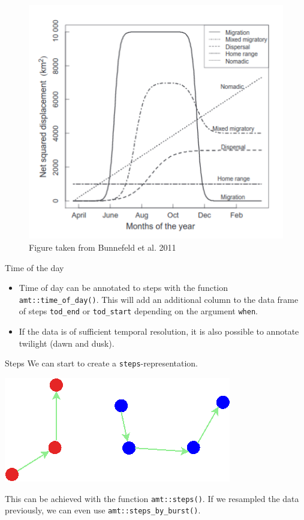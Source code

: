 \documentclass[ignorenonframetext,,t]{beamer}
\providecommand{\tightlist}{%
\setlength{\itemsep}{0pt}\setlength{\parskip}{0pt}}
\providecommand{\tightlist}{%
\setlength{\itemsep}{0pt}\setlength{\parskip}{0pt}}
\renewcommand{\tightlist}{\setlength{\itemsep}{1.4ex}\setlength{\parskip}{0pt}}
\begin{document}
\begin{frame}
\begin{figure}

{\centering \includegraphics[width=0.6\linewidth]{img/nsd} 

}

\caption{Figure taken from Bunnefeld et al. 2011}\label{fig:unnamed-chunk-10}
\end{figure}
\end{frame}

\begin{frame}[fragile]{Time of the day}
\protect\hypertarget{time-of-the-day}{}
\begin{itemize}
\tightlist
\item
  Time of day can be annotated to steps with the function
  \texttt{amt::time\_of\_day()}. This will add an additional column to
  the data frame of steps \texttt{tod\_end} or \texttt{tod\_start}
  depending on the argument \texttt{when}.
\item
  If the data is of sufficient temporal resolution, it is also possible
  to annotate twilight (dawn and dusk).
\end{itemize}
\end{frame}

\begin{frame}[fragile]{Steps}
\protect\hypertarget{steps}{}
We can start to create a \texttt{steps}-representation.

\begin{center}\includegraphics[width=0.5\linewidth]{img/steps} \end{center}

This can be achieved with the function \texttt{amt::steps()}. If we
resampled the data previously, we can even use
\texttt{amt::steps\_by\_burst()}.
\end{frame}
\end{document}
